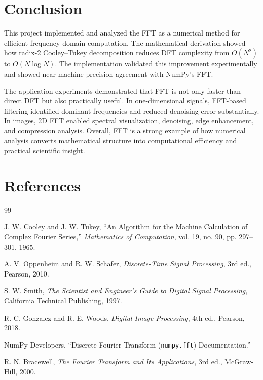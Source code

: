 \documentclass{zc-ust-hw}
\begin{document}
\section{Conclusion}
This project implemented and analyzed the FFT as a numerical method for efficient frequency-domain computation. The mathematical derivation showed how radix-2 Cooley--Tukey decomposition reduces DFT complexity from \(O(N^2)\) to \(O(N\log N)\). The implementation validated this improvement experimentally and showed near-machine-precision agreement with NumPy's FFT.

The application experiments demonstrated that FFT is not only faster than direct DFT but also practically useful. In one-dimensional signals, FFT-based filtering identified dominant frequencies and reduced denoising error substantially. In images, 2D FFT enabled spectral visualization, denoising, edge enhancement, and compression analysis. Overall, FFT is a strong example of how numerical analysis converts mathematical structure into computational efficiency and practical scientific insight.

\section{References}
\begin{thebibliography}{99}

J. W. Cooley and J. W. Tukey,
``An Algorithm for the Machine Calculation of Complex Fourier Series,''
\textit{Mathematics of Computation}, vol. 19, no. 90, pp. 297--301, 1965.

A. V. Oppenheim and R. W. Schafer,
\textit{Discrete-Time Signal Processing},
3rd ed., Pearson, 2010.

S. W. Smith,
\textit{The Scientist and Engineer's Guide to Digital Signal Processing},
California Technical Publishing, 1997.

R. C. Gonzalez and R. E. Woods,
\textit{Digital Image Processing},
4th ed., Pearson, 2018.

NumPy Developers,
``Discrete Fourier Transform (\texttt{numpy.fft}) Documentation.''

R. N. Bracewell,
\textit{The Fourier Transform and Its Applications},
3rd ed., McGraw-Hill, 2000.

\end{thebibliography}

\appendix
\end{document}
